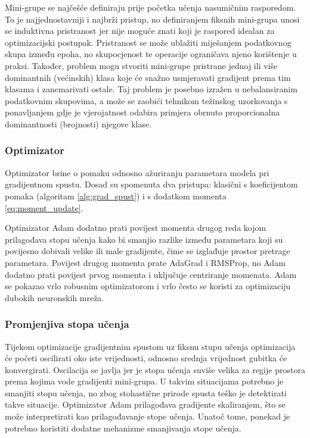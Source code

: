 \documentclass[times, utf8, numeric, diplomski]{fer}
\begin{document}
Mini-grupe se najčešće definiraju prije početka učenja nasumičnim rasporedom. To je najjednostavniji i najbrži pristup, no definiranjem fiksnih mini-grupa unosi se induktivna pristranost jer nije moguće znati koji je raspored idealan za optimizacijski postupak. Pristranost se može ublažiti miješanjem podatkovnog skupa između epoha, no skupocjenost te operacije ograničava njeno korištenje u praksi. Također, problem mogu stvoriti mini-grupe pristrane jednoj ili više dominantnih (većinskih) klasa koje će snažno usmjeravati gradijent prema tim klasama i zanemarivati ostale. Taj problem je posebno izražen u nebalansiranim podatkovnim skupovima, a može se zaobići tehnikom težinskog uzorkovanja s ponavljanjem gdje je vjerojatnost odabira primjera obrnuto proporcionalna dominantnosti (brojnosti) njegove klase.

\subsubsection{Optimizator}
Optimizator brine o pomaku odnosno ažuriranju parametara modela pri gradijentnom spustu. Dosad su spomenuta dva pristupa: klasični s koeficijentom pomaka (algoritam \ref{alg:grad_spust}) i s dodatkom momenta \eqref{eq:moment_update}.

Optimizator Adam  dodatno prati povijest momenta drugog reda kojom prilagođava stopu učenja kako bi smanjio razlike između parametara koji su povijesno dobivali velike ili male gradijente, čime se izglađuje prostor pretrage parametara. Povijest drugog momenta prate AdaGrad i RMSProp, no Adam dodatno prati povijest prvog momenta i uključuje centriranje momenata. Adam se pokazao vrlo robusnim optimizatorom i vrlo često se koristi za optimizaciju dubokih neuronskih mreža. \citep[poglavlje~8.5]{goodfellowbook}

\subsubsection{Promjenjiva stopa učenja}
Tijekom optimizacije gradijentnim spustom uz fiksnu stupu učenja optimizacija će početi oscilirati oko iste vrijednosti, odnosno srednja vrijednost gubitka će konvergirati. Oscilacija se javlja jer je stopa učenja suviše velika za regije prostora prema kojima vode gradijenti mini-grupa. U takvim situacijama potrebno je smanjiti stopu učenja, no zbog stohastične prirode spusta teško je detektirati takve situacije. Optimizator Adam prilagođava gradijente skaliranjem, što se može interpretirati kao prilagođavanje stope učenja. Unatoč tome, ponekad je potrebno koristiti dodatne mehanizme smanjivanja stope učenja.
\end{document}
